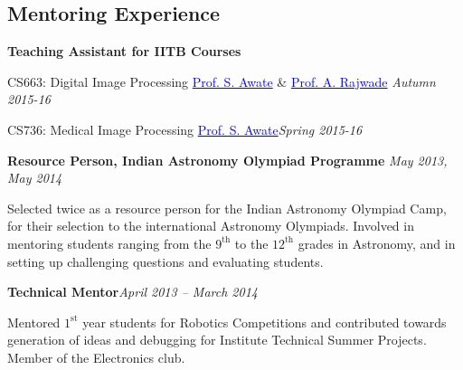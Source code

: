 \documentclass[margin,line]{res}
\newenvironment{list1}{
  \begin{list}{\ding{113}}{%
      \setlength{\itemsep}{0in}
      \setlength{\parsep}{0in} \setlength{\parskip}{0in}
      \setlength{\topsep}{0in} \setlength{\partopsep}{0in} 
      \setlength{\leftmargin}{0.17in}}}{\end{list}}
\begin{document}
\begin{resume}
\section{\sc Mentoring Experience}
\textbf{Teaching Assistant for IITB Courses}
\begin{list1}
\item[]CS663: Digital Image Processing \hspace{0.5cm} \href{https://www.cse.iitb.ac.in/~suyash}{\textcolor{blue}{Prof. S. Awate}} \& \href{https://www.cse.iitb.ac.in/~ajitvr}{\textcolor{blue}{Prof. A. Rajwade}} \hfill{\textit{Autumn 2015-16}}
\item[]CS736: Medical Image Processing \hspace{2cm} \href{https://www.cse.iitb.ac.in/~suyash}{\textcolor{blue}{Prof. S. Awate}}\hfill{\textit{Spring 2015-16}}
\end{list1}

\vspace*{-0.1in}

\textbf{Resource Person, Indian Astronomy Olympiad Programme} \hfill \textit{May 2013, May 2014} \\
\vspace*{-.15in}
\begin{list1}
\item[] Selected twice as a resource person for the Indian Astronomy Olympiad Camp, for their selection to the international Astronomy Olympiads. Involved in mentoring students ranging from the $9^\text{th}$ to the $12^\text{th}$ grades in Astronomy, and in setting up challenging questions and evaluating students.
\end{list1}

\vspace*{-0.1in}

\textbf{Technical Mentor}\hfill \textit{April 2013 -- March 2014} \\
\vspace*{-.15in}
\begin{list1}
\item[] Mentored $1^\text{st}$ year students for Robotics Competitions and contributed towards generation of ideas and debugging for Institute Technical Summer Projects. Member of the Electronics club.
\end{list1}


\end{resume}
\end{document}
